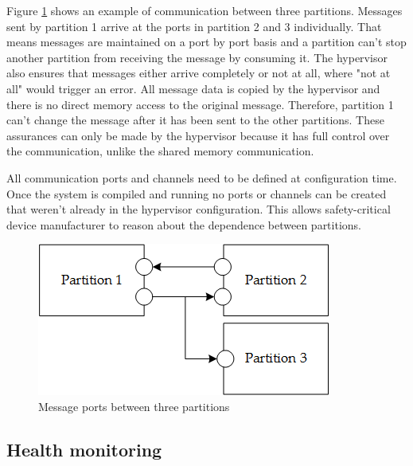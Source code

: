 Figure \ref{fig:message_ports} shows an example of communication between three partitions. 
Messages sent by partition 1 arrive at the ports in partition 2 and 3 individually. That means messages are maintained on a port by port basis and a partition can't stop another partition from receiving the message by consuming it. The hypervisor also ensures that messages either arrive completely or not at all, where "not at all" would trigger an error. All message data is copied by the hypervisor and there is no direct memory access to the original message. Therefore, partition 1 can't change the message after it has been sent to the other partitions. These assurances can only be made by the hypervisor because it has full control over the communication, unlike the shared memory communication.

All communication ports and channels need to be defined at configuration time. Once the system is compiled and running no ports or channels can be created that weren't already in the hypervisor configuration. This allows safety-critical device manufacturer to reason about the dependence between partitions.
\begin{figure}[hb!]
\centering
\includegraphics[scale=0.75]{Figures/message_ports.png}
\decoRule
\caption{Message ports between three partitions}
\label{fig:message_ports}
\end{figure}


\subsection{Health monitoring}

